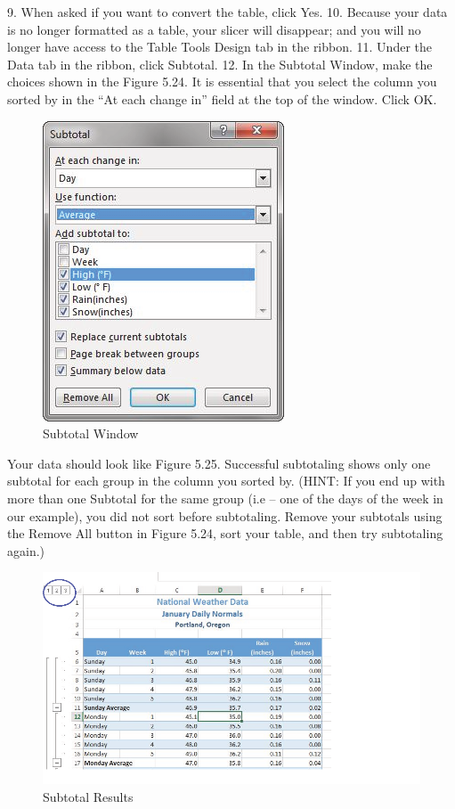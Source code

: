 9. When asked if you want to convert the table, click Yes.
10. Because your data is no longer formatted as a table, your slicer will disappear; and you will no
longer have access to the Table Tools Design tab in the ribbon.
11. Under the Data tab in the ribbon, click Subtotal.
12. In the Subtotal Window, make the choices shown in the Figure 5.24. It is essential that you select
the column you sorted by in the “At each change in” field at the top of the window. Click OK.


\begin{figure}[H]
	\centering
	\includegraphics[width=\maxwidth{.95\linewidth}]{gfx/ch05_fig24}
	\caption{Subtotal Window}
	\label{05:fig24}
\end{figure}





Your data should look like Figure 5.25. Successful subtotaling shows only one subtotal for each group
in the column you sorted by. (HINT: If you end up with more than one Subtotal for the same group
(i.e – one of the days of the week in our example), you did not sort before subtotaling. Remove your
subtotals using the Remove All button in Figure 5.24, sort your table, and then try subtotaling again.)


\begin{figure}[H]
	\centering
	\includegraphics[width=\maxwidth{.95\linewidth}]{gfx/ch05_fig25}
	\caption{Subtotal Results}
	\label{05:fig25}
\end{figure}




